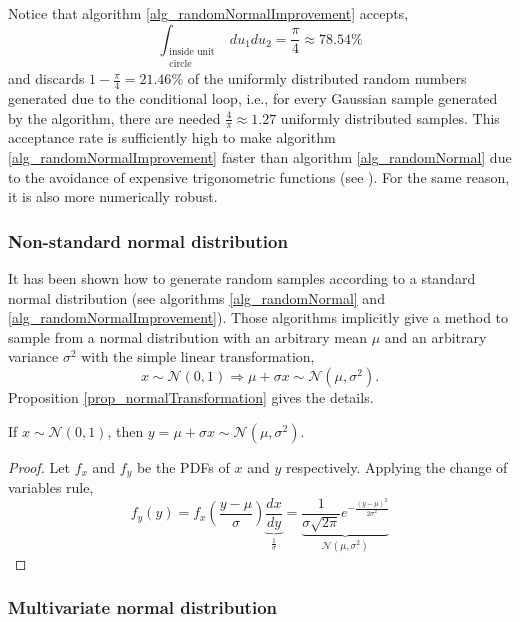 \begin{remark}
  Notice that algorithm \ref{alg_randomNormalImprovement} accepts,
  $$
    \int_{\substack{\text{inside unit} \\ \text{circle}}} du_1 du_2 = \frac{\pi}{4} \approx 78.54 \% 
  $$
  and discards $1-\frac{\pi}{4} = 21.46 \%$ of the uniformly distributed random numbers generated due to the conditional loop, i.e., for every Gaussian sample generated by the algorithm, there are needed $\frac{4}{\pi} \approx 1.27$ uniformly distributed samples. This acceptance rate is sufficiently high to make algorithm \ref{alg_randomNormalImprovement} faster than algorithm \ref{alg_randomNormal} due to the avoidance of expensive trigonometric functions (see \cite{bell1968}). For the same reason, it is also more numerically robust.
\end{remark}

\subsubsection{Non-standard normal distribution} \label{sec_nonstandardnormal}

It has been shown how to generate random samples according to a standard normal distribution (see algorithms \ref{alg_randomNormal} and \ref{alg_randomNormalImprovement}). Those algorithms implicitly give a method to sample from a normal distribution with an arbitrary mean $\mu$ and an arbitrary variance $\sigma^2$ with the simple linear transformation,
$$
  x \sim \mathcal{N}(0,1) \Longrightarrow \mu + \sigma x \sim \mathcal{N}(\mu,\sigma^2).
$$
Proposition \ref{prop_normalTransformation} gives the details.

\begin{proposition} \label{prop_normalTransformation}
If $x \sim \mathcal{N}(0,1)$, then $y = \mu + \sigma x \sim \mathcal{N}(\mu,\sigma^2)$.
\begin{proof}
  Let $f_x$ and $f_y$ be the PDFs of $x$ and $y$ respectively. Applying the change of variables rule,
  $$
    f_y(y) = f_x \left( \frac{y-\mu}{\sigma} \right) \underbrace{\frac{dx}{dy}}_{\frac{1}{\sigma}}
           = \underbrace{\frac{1}{\sigma\sqrt{2\pi}}e^{-\frac{(y-\mu)^2}{2\sigma^2}}}_{\mathcal{N}(\mu,\sigma^2)}
  $$
\end{proof}
\end{proposition}

\subsubsection{Multivariate normal distribution} \label{sec_multivariateNormal}

